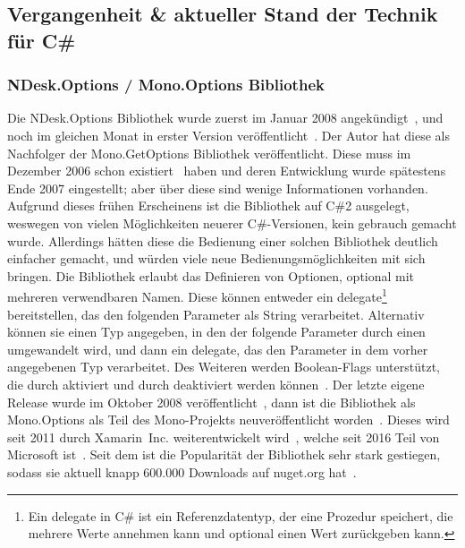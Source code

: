 \subsection{Vergangenheit \& aktueller Stand der Technik für C\#}\label{subsec:CurrentState}
\subsubsection{NDesk.Options / Mono.Options Bibliothek}
Die NDesk.Options Bibliothek wurde zuerst im Januar 2008 angekündigt~\cite{NDeskAnnouncement},
und noch im gleichen Monat in erster Version veröffentlicht~\cite{NDesk1stRelease}.
Der Autor hat diese als Nachfolger der Mono.GetOptions Bibliothek veröffentlicht.
Diese muss im Dezember 2006 schon existiert~\cite{MonoGetOptions3rdBlogPost} haben und deren Entwicklung wurde spätestens Ende 2007 eingestellt;
aber über diese sind wenige Informationen vorhanden.
Aufgrund dieses frühen Erscheinens ist die Bibliothek auf C\#2 ausgelegt, weswegen von vielen Möglichkeiten neuerer C\#-Versionen, kein gebrauch gemacht wurde.
Allerdings hätten diese die Bedienung einer solchen Bibliothek deutlich einfacher gemacht, und würden viele neue Bedienungsmöglichkeiten mit sich bringen.
Die Bibliothek erlaubt das Definieren von Optionen, optional mit mehreren verwendbaren Namen.
Diese können entweder ein delegate\footnote{Ein delegate in C\# ist ein Referenzdatentyp, der eine Prozedur speichert, die mehrere Werte annehmen kann und optional einen Wert zurückgeben kann.} bereitstellen, das den folgenden Parameter als String verarbeitet.
Alternativ können sie einen Typ angegeben, in den der folgende Parameter durch einen  umgewandelt wird,
und dann ein delegate, das den Parameter in dem vorher angegebenen Typ verarbeitet.
Des Weiteren werden Boolean-Flags unterstützt, die durch  aktiviert
und durch  deaktiviert werden können~\cite{NDeskOptionSetDocumentation}.
Der letzte eigene Release wurde im Oktober 2008 veröffentlicht~\cite{NDeskOptionsLastRelease},
dann ist die Bibliothek als Mono.Options als Teil des Mono-Projekts neuveröffentlicht worden~\cite{MonoOptions1stCommit}.
Dieses wird seit 2011 durch Xamarin~Inc. weiterentwickelt wird~\cite{MonoFutureInterview}, welche seit 2016 Teil von Microsoft ist~\cite{MicrosoftBlogAcquireXamarin}.
Seit dem ist die Popularität der Bibliothek sehr stark gestiegen, sodass sie aktuell knapp 600.000 Downloads auf nuget.org hat~\cite{MonoOptionsNuget}.
